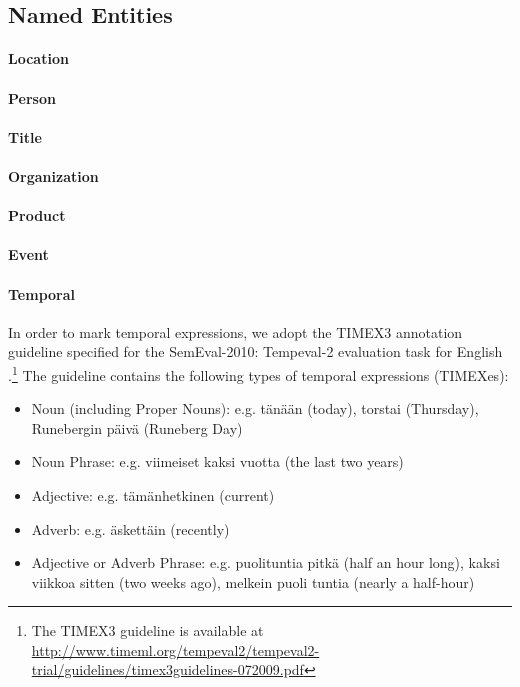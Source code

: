 \documentclass[11pt]{article}
\begin{document}
\subsection{Named Entities}


\paragraph{Location}

\paragraph{Person}

\paragraph{Title}

\paragraph{Organization}

\paragraph{Product}

\paragraph{Event}

\paragraph{Temporal}

In order to mark temporal expressions, we adopt the TIMEX3 annotation guideline specified for the SemEval-2010: Tempeval-2 evaluation task for English \citep{verhagen2010}.\footnote{The TIMEX3 guideline is available at \url{http://www.timeml.org/tempeval2/tempeval2-trial/guidelines/timex3guidelines-072009.pdf}} The guideline contains the following types of temporal expressions (TIMEXes): 

\begin{itemize}

\item[1.] Noun (including Proper Nouns): e.g. t\"an\"a\"an (today), torstai (Thursday), Runebergin p\"aiv\"a (Runeberg Day)
\item[2.] Noun Phrase: e.g. viimeiset kaksi vuotta (the last two years)
\item[3.] Adjective: e.g. t\"am\"anhetkinen (current)
\item[4.] Adverb: e.g. \"askett\"ain (recently)
\item[5.] Adjective or Adverb Phrase: e.g. puolituntia pitk\"a (half an hour long), kaksi viikkoa sitten (two weeks ago), melkein puoli tuntia (nearly a half-hour)

\end{itemize}
\end{document}
